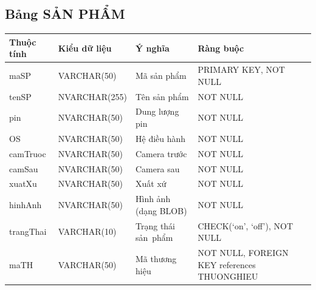 \documentclass[a4paper,12pt]{report}
\begin{document}
\subsection{Bảng SẢN PHẨM}
\noindent
\begin{center}
    \begin{tabular}{|>{\centering\arraybackslash}p{3cm}|
        >{\centering\arraybackslash}p{4cm}|
        >{\centering\arraybackslash}p{4cm}|
        >{\centering\arraybackslash}p{4cm}|}
        \hline
        \textbf{Thuộc tính}                                                                                                               &
        \textbf{Kiểu dữ liệu}                                                                                                                             &
        \textbf{Ý nghĩa}                                                                                                 &
        \textbf{Ràng buộc}                                                                                                         \\
        \hline
        maSP &  VARCHAR(50)  & Mã sản phẩm & PRIMARY KEY, NOT NULL \\
        \hline
        tenSP &  NVARCHAR(255)  & Tên sản phẩm & NOT NULL \\
        \hline
        pin & NVARCHAR(50) & Dung lượng pin & NOT NULL \\                                                                                                                          
        \hline
        OS & NVARCHAR(50) & Hệ điều hành & NOT NULL \\                                                                                                                          
        \hline
        camTruoc & NVARCHAR(50) & Camera trước & NOT NULL \\                                                                                                                          
        \hline
        camSau & NVARCHAR(50) & Camera sau & NOT NULL \\                                                                                                                          
        \hline
        xuatXu & NVARCHAR(50) & Xuất xứ & NOT NULL \\                                                                                                                          
        \hline
        hinhAnh & NVARCHAR(50) & Hình ảnh (dạng BLOB) & NOT NULL \\                                                                                                                          
        \hline
        trangThai &  VARCHAR(10)  & Trạng thái sản~phẩm & CHECK(‘on’, ‘off’), NOT NULL \\
        \hline
        maTH & VARCHAR(50) & Mã thương hiệu & NOT NULL, FOREIGN KEY references THUONGHIEU \\                                                                                                                          
        \hline
    \end{tabular}
\end{center}
\end{document}
